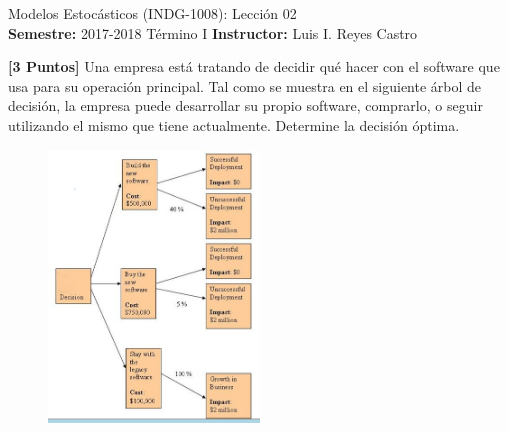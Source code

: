 \documentclass[ a4paper, twoside, 11pt]{article}
\newcommand{\numero}{02}
\begin{document}
\allowdisplaybreaks

\begin{center}
\Large Modelos Estoc\'asticos (INDG-1008): Lecci\'on \numero \\[1ex]
\small \textbf{Semestre:} 2017-2018 T\'ermino I \qquad
\textbf{Instructor:} Luis I. Reyes Castro
\end{center}
\halfskip



\begin{problem}
\textbf{[3 Puntos]} Una empresa est\'a tratando de decidir qu\'e hacer con el software que usa para su operaci\'on principal. Tal como se muestra en el siguiente \'arbol de decisi\'on, \linebreak la empresa puede desarrollar su propio software, comprarlo, o seguir utilizando el mismo que tiene actualmente. Determine la decisi\'on \'optima. 

\begin{figure}[htb]
\centering
\includegraphics[width=0.5\textwidth]{problema_arbol-decision.jpg}
\end{figure}


\end{problem}
\end{document}
